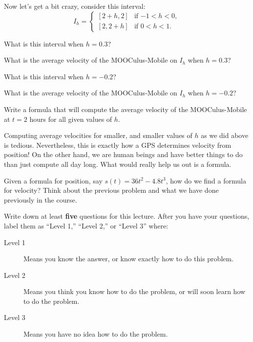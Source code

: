 \documentclass{ximera}
\begin{document}
Now let's get a bit crazy, consider this interval:
\[
I_h = 
\begin{cases}
  [2+h,2]  & \text{if $-1<h<0$}, \\ %
  [2,2+h]  & \text{if $0<h<1$}.     %
\end{cases}
\]

\begin{question}
  What is this interval when $h = 0.3$?
\end{question}

\begin{question}
  What is the average velocity of the MOOCulus-Mobile on $I_h$ when $h =
  0.3$?
\end{question}

\begin{question}
  What is this interval when $h = -0.2$?
\end{question}

\begin{question}
  What is the average velocity of the MOOCulus-Mobile on $I_h$ when $h =
  -0.2$?
\end{question}

\begin{question}
  Write a formula that will compute the average velocity of the
  MOOCulus-Mobile at $t=2$ hours for all given values of $h$.
\end{question}

Computing average velocities for smaller, and smaller values of $h$ as
we did above is tedious. Nevertheless, this is exactly how a GPS
determines velocity from position! On the other hand, we are human
beings and have better things to do than just compute all day
long. What would really help us out is a formula.

\begin{question}
  Given a formula for position, say $s(t) = 36t^2 -4.8t^3$, how do we
  find a formula for velocity?  Think about the previous problem and
  what we have done previously in the course.
  \begin{freeResponse}
  \end{freeResponse} 
\end{question}

\begin{xarmaBoost}
  Write down at least \textbf{five} questions for this lecture. After
you have your questions, label them as ``Level 1,'' ``Level 2,'' or ``Level 3'' where:
\begin{description}
\item[Level 1] Means you know the answer, or know exactly how to do
  this problem.
\item[Level 2] Means you think you know how to do the problem, or will
  soon learn how to do the problem.
\item[Level 3] Means you have no idea how to do the problem.
\end{description}
\begin{freeResponse}
\end{freeResponse}
\end{xarmaBoost}
\end{document}
